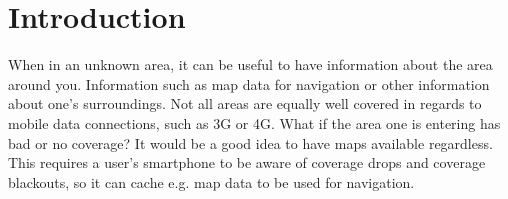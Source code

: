 \chapter{Introduction}
\label{chap:intro}

When in an unknown area, it can be useful to have information about the area around you. Information such as map data for navigation or other information about one's surroundings. Not all areas are equally well covered in regards to mobile data connections, such as 3G or 4G. What if the area one is entering has bad or no coverage? It would be a good idea to have maps available regardless. This requires a user's smartphone to be aware of coverage drops and coverage blackouts, so it can cache e.g. map data to be used for navigation.



